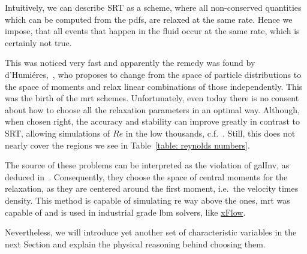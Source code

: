 Intuitively, we can describe SRT as a scheme, where all non-conserved quantities which can be computed from the \glspl{pdf}, are relaxed at the same rate.
Hence we impose, that all events that happen in the fluid occur at the same rate, which is certainly not true.

This was noticed very fast and apparently the remedy was found by d'Humiéres,~\cite{d1994generalized}, who proposes to change from the space of particle distributions to the space of moments and relax linear combinations of those independently.
This was the birth of the \gls{mrt} schemes.
Unfortunately, even today there is no consent about how to choose all the relaxation parameters in an optimal way.
Although, when chosen right, the accuracy and stability can improve greatly in contrast to SRT, allowing simulations of $Re$ in the low thousands, c.f.~\cite{d2002multiple}. Still, this does not nearly cover the regions we see in Table~\ref{table: reynolds numbers}.

The source of these problems can be interpreted as the violation of \gls{galInv}, as deduced in~\cite{geier2006cascaded}. Consequently, they choose the space of central moments for the relaxation, as they are centered around the first moment, i.e.\ the velocity times density.
This method is capable of simulating \gls{re} way above the ones, \gls{mrt} was capable of and is used in industrial grade \gls{lbm} solvers, like \href{http://www.xflowcfd.com/technology/view/cfd}{xFlow}.

Nevertheless, we will introduce yet another set of characteristic variables in the next Section and explain the physical reasoning behind choosing them.
